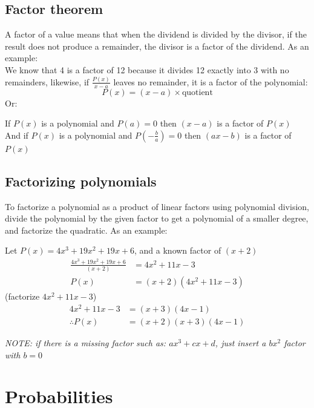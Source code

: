 \documentclass{book}
\begin{document}
\section{Factor theorem}
A factor of a value means that when the dividend is divided by the divisor, if the result does not produce a remainder, the divisor is a factor of the dividend.  As an example:\\
We know that 4 is a factor of 12 because it divides 12 exactly into 3 with no remainders, likewise, if $\frac{P(x)}{x - a}$ leaves no remainder, it is a factor of the polynomial:\\
\[
	P(x) = (x - a) \times \text{quotient}
\]
Or:
\begin{center}
	If $P(x)$ is a polynomial and $P(a) = 0$ then $(x - a)$ is a factor of $P(x)$\\
	And if $P(x)$ is a polynomial and $P(-\frac{b}{a}) = 0$ then $(ax - b)$ is a factor of $P(x)$
\end{center}

\section{Factorizing polynomials}
To factorize a polynomial as a product of linear factors using polynomial division, divide the polynomial by the given factor to get a polynomial of a smaller degree, and factorize the quadratic.  As an example:\\
\begin{center}
	Let $P(x) = 4x^3 + 19x^2 + 19x + 6$, and a known factor of $(x + 2)$
	\begin{align*}
		\frac{4x^3 + 19x^2 + 19x + 6}{(x + 2)} & = 4x^2 + 11x - 3          \\
		P(x)                                   & = (x + 2)(4x^2 + 11x - 3)
	\end{align*}
	(factorize $4x^2 + 11x - 3$)
	\begin{align*}
		4x^2 + 11x - 3  & = (x + 3)(4x - 1)        \\
		\therefore P(x) & = (x + 2)(x + 3)(4x - 1)
	\end{align*}
\end{center}

\begin{center}
	\emph{NOTE: if there is a missing factor such as: $ax^3 + cx + d$, just insert a $bx^2$ factor with $b = 0$}
\end{center}

\chapter{Probabilities}
\end{document}
